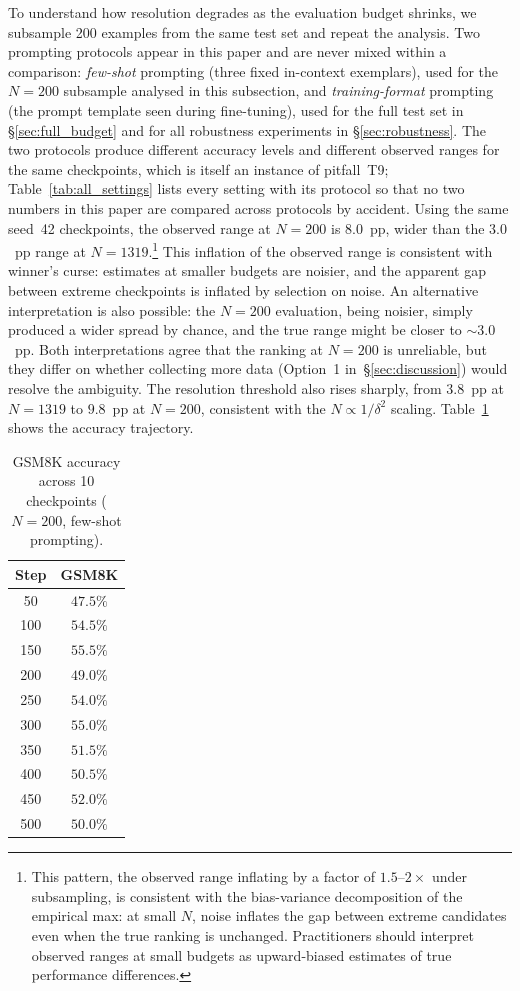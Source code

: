 \documentclass[pdflatex,sn-mathphys-ay,oneside]{sn-jnl}
\theoremstyle{thmstylethree}
\begin{document}
To understand how resolution degrades as the evaluation budget shrinks, we subsample 200 examples from the same test set and repeat the analysis. Two prompting protocols appear in this paper and are never mixed within a comparison: \emph{few-shot} prompting (three fixed in-context exemplars), used for the $N=200$ subsample analysed in this subsection, and \emph{training-format} prompting (the prompt template seen during fine-tuning), used for the full test set in \S\ref{sec:full_budget} and for all robustness experiments in \S\ref{sec:robustness}. The two protocols produce different accuracy levels and different observed ranges for the same checkpoints, which is itself an instance of pitfall~T9; Table~\ref{tab:all_settings} lists every setting with its protocol so that no two numbers in this paper are compared across protocols by accident. Using the same seed~42 checkpoints, the observed range at $N=200$ is $8.0$~pp, wider than the $3.0$~pp range at $N=1319$.\footnote{This pattern, the observed range inflating by a factor of $1.5$--$2\times$ under subsampling, is consistent with the bias-variance decomposition of the empirical max: at small $N$, noise inflates the gap between extreme candidates even when the true ranking is unchanged. Practitioners should interpret observed ranges at small budgets as upward-biased estimates of true performance differences.} This inflation of the observed range is consistent with winner's curse: estimates at smaller budgets are noisier, and the apparent gap between extreme checkpoints is inflated by selection on noise. An alternative interpretation is also possible: the $N=200$ evaluation, being noisier, simply produced a wider spread by chance, and the true range might be closer to $\sim3.0$~pp. Both interpretations agree that the ranking at $N=200$ is unreliable, but they differ on whether collecting more data (Option~1 in~\S\ref{sec:discussion}) would resolve the ambiguity. The resolution threshold also rises sharply, from $3.8$~pp at $N=1319$ to $9.8$~pp at $N=200$, consistent with the $N\propto 1/\delta^2$ scaling. Table~\ref{tab:trajectory} shows the accuracy trajectory.

\begin{table}[t]
\caption{GSM8K accuracy across 10 checkpoints ($N=200$, few-shot prompting).}
\label{tab:trajectory}
\centering
\begin{tabular}{cc}\toprule
\textbf{Step} & \textbf{GSM8K} \\\midrule
50  & $47.5\%$ \\
100 & $54.5\%$ \\
150 & $55.5\%$ \\
200 & $49.0\%$ \\
250 & $54.0\%$ \\
300 & $55.0\%$ \\
350 & $51.5\%$ \\
400 & $50.5\%$ \\
450 & $52.0\%$ \\
500 & $50.0\%$ \\\bottomrule
\end{tabular}
\end{table}
\end{document}

